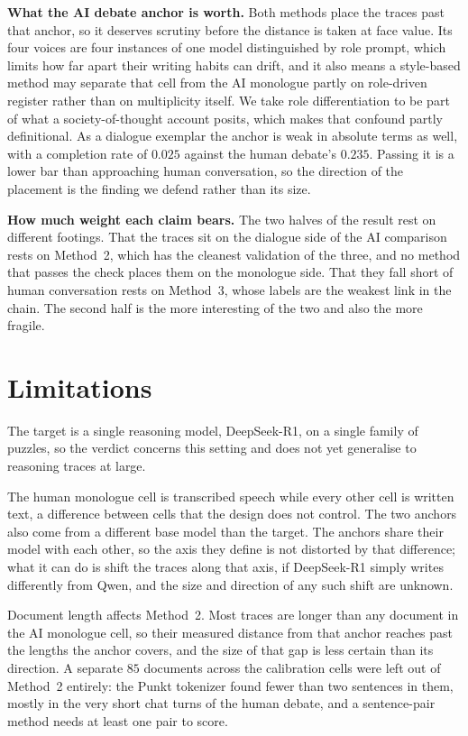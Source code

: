 \documentclass[10pt,twocolumn]{article}
\begin{document}
\textbf{What the AI debate anchor is worth.} Both methods place the traces past that anchor, so it
deserves scrutiny before the distance is taken at face value. Its four voices are four instances of
one model distinguished by role prompt, which limits how far apart their writing habits can drift,
and it also means a style-based method may separate that cell from the AI monologue partly on
role-driven register rather than on multiplicity itself. We take role differentiation to be part of
what a society-of-thought account posits, which makes that confound partly definitional. As a
dialogue exemplar the anchor is weak in absolute terms as well, with a completion rate of $0.025$
against the human debate's $0.235$. Passing it is a lower bar than approaching human conversation, so
the direction of the placement is the finding we defend rather than its size.

\textbf{How much weight each claim bears.} The two halves of the result rest on different footings.
That the traces sit on the dialogue side of the AI comparison rests on Method~2, which has the
cleanest validation of the three, and no method that passes the check places them on the monologue
side. That they fall short of human conversation rests on Method~3, whose labels are the weakest link
in the chain. The second half is the more interesting of the two and also the more fragile.

\section{Limitations}
The target is a single reasoning model, DeepSeek-R1, on a single family of puzzles, so the verdict
concerns this setting and does not yet generalise to reasoning traces at large.

The human monologue cell is transcribed speech while every other cell is written text, a difference
between cells that the design does not control. The two anchors also come from a different base model
than the target. The anchors share their model with each other, so the axis they define is not
distorted by that difference; what it can do is shift the traces along that axis, if DeepSeek-R1
simply writes differently from Qwen, and the size and direction of any such shift are unknown.

Document length affects Method~2. Most traces are longer than any document in the AI monologue cell,
so their measured distance from that anchor reaches past the lengths the anchor covers, and the size
of that gap is less certain than its direction. A separate $85$ documents across the calibration
cells were left out of Method~2 entirely: the Punkt tokenizer found fewer than two sentences in them,
mostly in the very short chat turns of the human debate, and a sentence-pair method needs at least
one pair to score.
\end{document}
